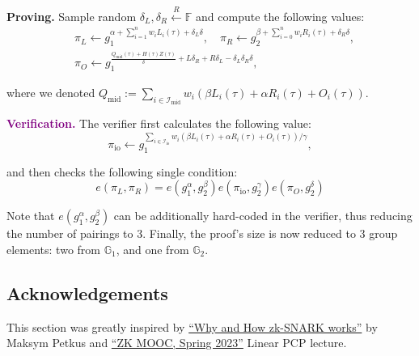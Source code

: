 \documentclass[../lecture-notes-148x210.tex]{subfiles}
\begin{document}
\textcolor{green!50!black}{\textbf{Proving.}} Sample random $\delta_L,\delta_R \xleftarrow{R} \mathbb{F}$ and compute the following values:
\begin{equation*}    
    \begin{aligned}
        &\pi_L \gets g_1^{\alpha + \sum_{i=1}^n w_iL_i(\tau) + \delta_L\delta}, \quad \pi_R \gets g_2^{\beta + \sum_{i=0}^n w_iR_i(\tau) + \delta_R\delta}, \\
        &\pi_O \gets g_1^{\frac{Q_{\text{mid}}(\tau)+H(\tau)Z(\tau)}{\delta} + L\delta_R + R\delta_L - \delta_L\delta_R\delta},
    \end{aligned}
\end{equation*}

where we denoted $Q_{\text{mid}} := \sum_{i \in \mathcal{I}_{\text{mid}}}w_i(\beta L_i(\tau) + \alpha R_i(\tau) + O_i(\tau))$.

\textcolor{purple}{\textbf{Verification.}} The verifier first calculates the following value:
\begin{equation*}
    \pi_{\text{io}} \gets g_1^{\sum_{i \in \mathcal{I}_{\text{io}}}w_i(\beta L_i(\tau) + \alpha R_i(\tau) + O_i(\tau))/\gamma},
\end{equation*}

and then checks the following single condition:
\begin{equation*}
    e(\pi_L, \pi_R) = e(g_1^{\alpha}, g_2^{\beta})e(\pi_{\text{io}},g_2^{\gamma})e(\pi_O,g_2^{\delta})
\end{equation*}

Note that $e(g_1^{\alpha}, g_2^{\beta})$ can be additionally hard-coded in the verifier, thus reducing the number of pairings to 3. Finally, the proof's size is now reduced to 3 group elements: two from $\mathbb{G}_1$, and one from $\mathbb{G}_2$.

\subsection*{Acknowledgements}

This section was greatly inspired by
\href{https://arxiv.org/abs/1906.07221}{``Why and How zk-SNARK works''} by
Maksym Petkus and \href{https://rdi.berkeley.edu/zk-learning/}{``ZK MOOC, Spring
2023''} Linear PCP lecture.
\end{document}
